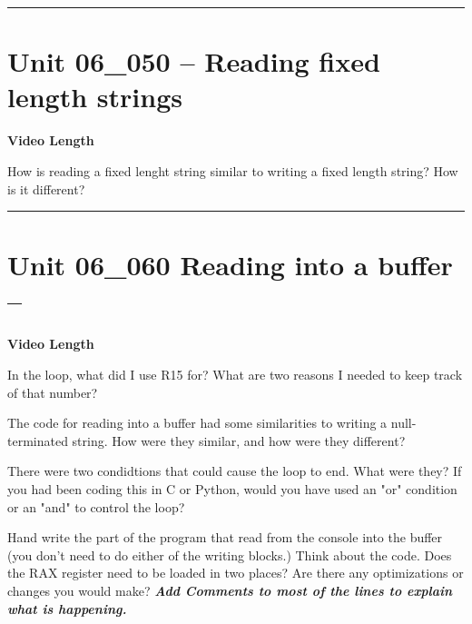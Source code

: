 \documentclass[letterpaper,12pt]{exam}
\newcommand{\unit}{Unit 06}
\begin{document}
\begin{questions}
\rule{0.5\textwidth}{.4pt} %
\section*{\unit\_050 -- Reading fixed length strings }
\par{\selectfont\textbf{Video Length }}
\begin{samepage}
    \question How is reading a fixed lenght string similar to writing a fixed length string?  How is it different?
    \vspace{25mm}
\end{samepage}
\par
\rule{0.5\textwidth}{.4pt} %
\section*{\unit\_060 Reading into a buffer -- }
\par{\selectfont\textbf{Video Length }}
\begin{samepage}
    \question In the loop, what did I use R15 for?  What are two reasons I needed to keep track of that number?
    \vspace{25mm}
\end{samepage}
\par
 
\begin{samepage}
    \question The code for reading into a buffer had some similarities to writing a null-terminated string.  How were they similar, and how were they different?
    \vspace{15mm}
\end{samepage}
\begin{samepage}
    \question There were two condidtions that could cause the loop to end.  What were they?  If you had been coding this in C or Python, would you have used an "or" condition or an "and" to control the loop?
    \vspace{5mm}
\end{samepage}
\par
 
\begin{samepage}
    \question Hand write the part of the program that read from the console into the buffer (you don't need to do either of the writing blocks.)  Think about the code. Does the RAX register need to be loaded in two places?  Are there any optimizations or changes you would make?
     \textbf{\textit{Add Comments to most of the lines to explain what is happening.}}
    \vspace{5mm}
\end{samepage}
\par
 


\end{questions} 


\end{document}
